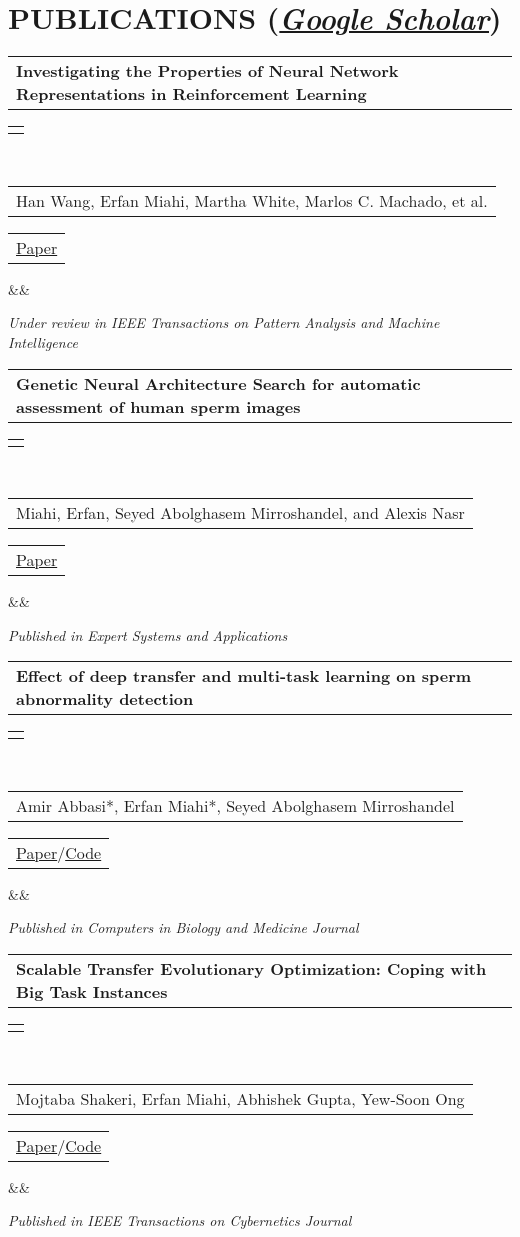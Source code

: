 \documentclass[11pt,a4paper,roman,colorlinks,linkcolor=blue,filecolor=magenta,urlcolor=cyan]{moderncv}        %
\makeatletter
\newcommand*{\papercventry}[7][.25em]{
  \begin{tabular}{@{}l} 
    {\bfseries #4}
  \end{tabular}
  \hfill%
  \begin{tabular}{l@{}}
     {\bfseries #5}
  \end{tabular} \\
  \begin{tabular}{@{}l} 
    { #3}
  \end{tabular}
  \hfill%
  \begin{tabular}{l@{}}
     { #2}
  \end{tabular}
  \ifx&#7&%
  \else{\\%
    \begin{minipage}{\maincolumnwidth}%
      \small#7%
    \end{minipage}}\fi%
  \par\addvspace{#1}}
\makeatother
\begin{document}
\section{PUBLICATIONS (\href{https://scholar.google.com/citations?user=7aP0Sp4AAAAJ&hl=en}{\textit{Google Scholar}})}
{\papercventry{\href{https://arxiv.org/abs/2203.15955}{Paper}}{Han Wang, Erfan Miahi, Martha White, Marlos C. Machado, et al.}{Investigating the Properties of Neural Network Representations in Reinforcement Learning}{}{}{}}
\textit{Under review in IEEE Transactions on Pattern Analysis and Machine Intelligence}

\vspace{2mm}
{\papercventry{\href{https://www.sciencedirect.com/science/article/abs/pii/S0957417421012914}{Paper}}{Miahi, Erfan, Seyed Abolghasem Mirroshandel, and Alexis Nasr}{Genetic Neural Architecture Search for automatic assessment of human sperm images}{}{}{}}
\textit{Published in Expert Systems and Applications}



\vspace{2mm}
\papercventry{\href{https://www.sciencedirect.com/science/article/abs/pii/S0010482520304522}{Paper}/\href{https://github.com/amirabbasii/Effect-of-Deep-Transfer-and-Multi-task-Learning-on-Sperm-Abnormality-Detection}{Code}}{Amir Abbasi*, Erfan Miahi*, Seyed Abolghasem Mirroshandel}{Effect of deep transfer and multi-task learning on sperm abnormality detection}{}{}{}
\textit{Published in Computers in Biology and Medicine Journal}

\vspace{2mm}
\papercventry{\href{https://ieeexplore.ieee.org/document/9761797}{Paper}/\href{https://github.com/erfanMhi/Transfer-Optimization}{Code}}{Mojtaba Shakeri, Erfan Miahi, Abhishek Gupta, Yew-Soon Ong}{Scalable Transfer Evolutionary Optimization: Coping with Big Task Instances}{}{}{}
\textit{Published in IEEE Transactions on Cybernetics Journal}
\end{document}
